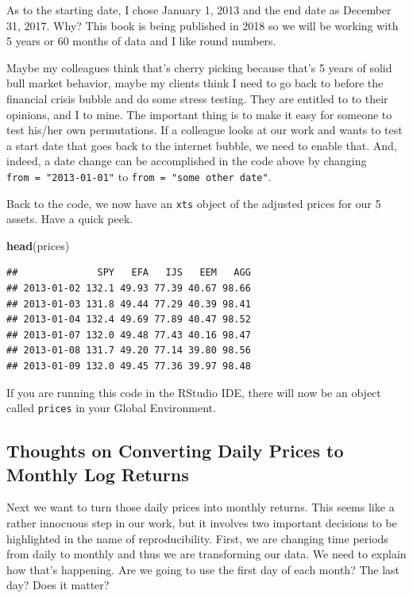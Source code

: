 \documentclass[]{krantz}
\makeatletter
\newenvironment{Shaded}{\begin{snugshade}}{\end{snugshade}}
\newcommand{\KeywordTok}[1]{\textcolor[rgb]{0.13,0.29,0.53}{\textbf{#1}}}
\newcommand{\NormalTok}[1]{#1}
\newenvironment{kframe}{%
\medskip{}
\setlength{\fboxsep}{.8em}
 \def\at@end@of@kframe{}%
 \ifinner\ifhmode%
  \def\at@end@of@kframe{\end{minipage}}%
  \begin{minipage}{\columnwidth}%
 \fi\fi%
 \def\FrameCommand##1{\hskip\@totalleftmargin \hskip-\fboxsep
 \colorbox{shadecolor}{##1}\hskip-\fboxsep
     \hskip-\linewidth \hskip-\@totalleftmargin \hskip\columnwidth}%
 \MakeFramed {\advance\hsize-\width
   \@totalleftmargin\z@ \linewidth\hsize
   \@setminipage}}%
 {\par\unskip\endMakeFramed%
 \at@end@of@kframe}
\renewenvironment{Shaded}{\begin{kframe}}{\end{kframe}}
\makeatother
\begin{document}
As to the starting date, I chose January 1, 2013 and the end date as
December 31, 2017. Why? This book is being published in 2018 so we will
be working with 5 years or 60 months of data and I like round numbers.

Maybe my colleagues think that's cherry picking because that's 5 years
of solid bull market behavior, maybe my clients think I need to go back
to before the financial crisis bubble and do some stress testing. They
are entitled to to their opinions, and I to mine. The important thing is
to make it easy for someone to test his/her own permutations. If a
colleague looks at our work and wants to test a start date that goes
back to the internet bubble, we need to enable that. And, indeed, a date
change can be accomplished in the code above by changing
\texttt{from\ =\ "2013-01-01"} to \texttt{from\ =\ "some\ other\ date"}.

Back to the code, we now have an \texttt{xts} object of the adjusted
prices for our 5 assets. Have a quick peek.

\begin{Shaded}
\begin{Highlighting}[]
\KeywordTok{head}\NormalTok{(prices)}
\end{Highlighting}
\end{Shaded}

\begin{verbatim}
##              SPY   EFA   IJS   EEM   AGG
## 2013-01-02 132.1 49.93 77.39 40.67 98.66
## 2013-01-03 131.8 49.44 77.29 40.39 98.41
## 2013-01-04 132.4 49.69 77.89 40.47 98.52
## 2013-01-07 132.0 49.48 77.43 40.16 98.47
## 2013-01-08 131.7 49.20 77.14 39.80 98.56
## 2013-01-09 132.0 49.45 77.36 39.97 98.48
\end{verbatim}

If you are running this code in the RStudio IDE, there will now be an
object called \texttt{prices} in your Global Environment.

\subsection*{Thoughts on Converting Daily Prices to Monthly Log
Returns}\label{thoughts-on-converting-daily-prices-to-monthly-log-returns}

Next we want to turn those daily prices into monthly returns. This seems
like a rather innocuous step in our work, but it involves two important
decisions to be highlighted in the name of reproducibility. First, we
are changing time periods from daily to monthly and thus we are
transforming our data. We need to explain how that's happening. Are we
going to use the first day of each month? The last day? Does it matter?
\end{document}
